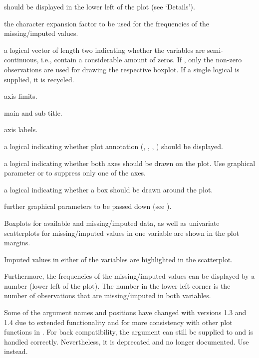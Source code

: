 \begin{Arguments}
\begin{ldescription}
should be displayed in the lower left of the plot (see `Details').
\item[\code{cex.numbers}] the character expansion factor to be used for the 
frequencies of the missing/imputed values.
\item[\code{zeros}] a logical vector of length two indicating whether the variables 
are semi-continuous, i.e., contain a considerable amount of zeros.  If 
, only the non-zero observations are used for drawing the 
respective boxplot.  If a single logical is supplied, it is recycled.
\item[\code{xlim, ylim}] axis limits.
\item[\code{main, sub}] main and sub title.
\item[\code{xlab, ylab}] axis labels.
\item[\code{ann}] a logical indicating whether plot annotation (, 
, , ) should be displayed.
\item[\code{axes}] a logical indicating whether both axes should be drawn on the 
plot.  Use graphical parameter  or  to suppress 
only one of the axes.
\item[\code{frame.plot}] a logical indicating whether a box should be drawn around 
the plot.
\item[\code{...}] further graphical parameters to be passed down (see 
).
\end{ldescription}
\end{Arguments}
%
\begin{Details}\relax
Boxplots for available and missing/imputed data, as well as univariate scatterplots 
for missing/imputed values in one variable are shown in the plot margins. 

Imputed values in either of the variables are highlighted in the scatterplot.

Furthermore, the frequencies of the missing/imputed values can be displayed by a 
number (lower left of the plot). The number in the lower left corner is the 
number of observations that are missing/imputed in both variables.
\end{Details}
%
\begin{Note}\relax
Some of the argument names and positions have changed with versions 1.3 and 
1.4 due to extended functionality and for more consistency with other plot 
functions in .  For back compatibility, the argument 
 can still be supplied to  and is handled 
correctly.  Nevertheless, it is deprecated and no longer documented.  Use 
 instead.
\end{Note}
